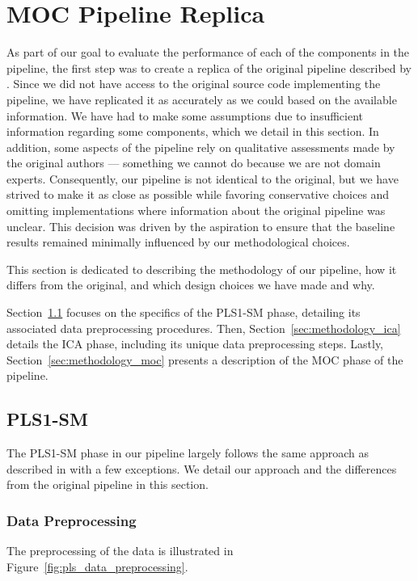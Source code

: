 \section{MOC Pipeline Replica}\label{sec:methodology}
As part of our goal to evaluate the performance of each of the components in the pipeline, the first step was to create a replica of the original pipeline described by \citet{cleggRecalibrationMarsScience2017}.
Since we did not have access to the original source code implementing the pipeline, we have replicated it as accurately as we could based on the available information.
We have had to make some assumptions due to insufficient information regarding some components, which we detail in this section.
In addition, some aspects of the pipeline rely on qualitative assessments made by the original authors --- something we cannot do because we are not domain experts.
Consequently, our pipeline is not identical to the original, but we have strived to make it as close as possible while favoring conservative choices and omitting implementations where information about the original pipeline was unclear.
This decision was driven by the aspiration to ensure that the baseline results remained minimally influenced by our methodological choices.

This section is dedicated to describing the methodology of our pipeline, how it differs from the original, and which design choices we have made and why.

Section~\ref{sec:methodology_pls1} focuses on the specifics of the PLS1-SM phase, detailing its associated data preprocessing procedures.
Then, Section~\ref{sec:methodology_ica} details the ICA phase, including its unique data preprocessing steps.
Lastly, Section~\ref{sec:methodology_moc} presents a description of the MOC phase of the pipeline.

\subsection{PLS1-SM}\label{sec:methodology_pls1}
The PLS1-SM phase in our pipeline largely follows the same approach as described in \citet{andersonImprovedAccuracyQuantitative2017} with a few exceptions.
We detail our approach and the differences from the original pipeline in this section.

\subsubsection{Data Preprocessing}\label{sec:pls1_data_preprocessing}
The preprocessing of the data is illustrated in Figure~\ref{fig:pls_data_preprocessing}.


